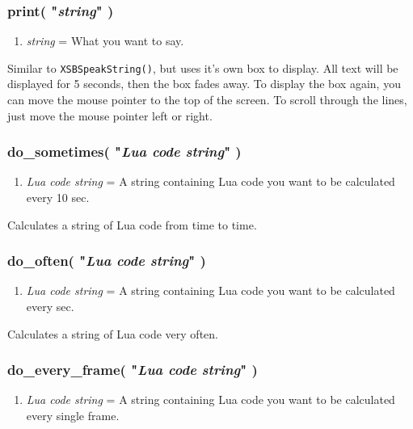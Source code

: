 \documentclass[11pt,parskip=half,a4paper]{scrartcl}
\begin{document}
\newpage
\subsubsection{print( "\emph{string}" )}

\begin{enumerate}
	\item \emph{string} = What you want to say.
\end{enumerate}

Similar to \verb|XSBSpeakString()|, but uses it's own box to display. All text will be displayed for 5 seconds, then the box fades away. To display the box again, you can move the mouse pointer to the top of the screen. To scroll through the lines, just move the mouse pointer left or right.

\subsubsection{do\_sometimes( "\emph{Lua code string}" )}

\begin{enumerate}
	\item \emph{Lua code string} = A string containing Lua code you want to be calculated every 10 sec.
\end{enumerate}

Calculates a string of Lua code from time to time.

\subsubsection{do\_often( "\emph{Lua code string}" )}

\begin{enumerate}
	\item \emph{Lua code string} = A string containing Lua code you want to be calculated every sec.
\end{enumerate}

Calculates a string of Lua code very often.

\subsubsection{do\_every\_frame( "\emph{Lua code string}" )}

\begin{enumerate}
	\item \emph{Lua code string} = A string containing Lua code you want to be calculated every single frame.
\end{enumerate}
\end{document}

